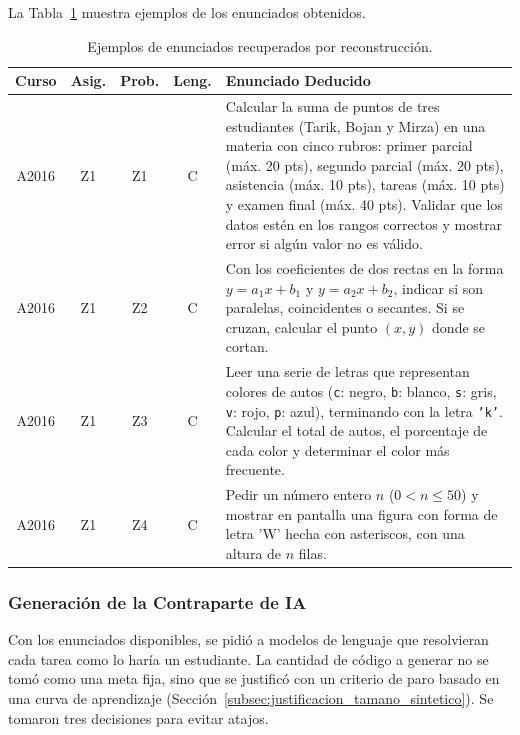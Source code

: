 La Tabla~\ref{tab:ejemplos_enunciados_inferidos} muestra ejemplos de los enunciados obtenidos.

\begin{table}[H]
    \centering
    \caption{Ejemplos de enunciados recuperados por reconstrucción.}
    \label{tab:ejemplos_enunciados_inferidos}
    \renewcommand{\arraystretch}{1.3}
    \small
    \begin{tabularx}{\textwidth}{|c|c|c|c|X|}
        \hline
        \textbf{Curso} & \textbf{Asig.} & \textbf{Prob.} & \textbf{Leng.} & \textbf{Enunciado Deducido} \\ \hline
        A2016 & Z1 & Z1 & C & Calcular la suma de puntos de tres estudiantes (Tarik, Bojan y Mirza) en una materia con cinco rubros: primer parcial (máx. 20 pts), segundo parcial (máx. 20 pts), asistencia (máx. 10 pts), tareas (máx. 10 pts) y examen final (máx. 40 pts). Validar que los datos estén en los rangos correctos y mostrar error si algún valor no es válido. \\ \hline
        A2016 & Z1 & Z2 & C & Con los coeficientes de dos rectas en la forma $y = a_1x + b_1$ y $y = a_2x + b_2$, indicar si son paralelas, coincidentes o secantes. Si se cruzan, calcular el punto $(x, y)$ donde se cortan. \\ \hline
        A2016 & Z1 & Z3 & C & Leer una serie de letras que representan colores de autos (\texttt{c}: negro, \texttt{b}: blanco, \texttt{s}: gris, \texttt{v}: rojo, \texttt{p}: azul), terminando con la letra \texttt{'k'}. Calcular el total de autos, el porcentaje de cada color y determinar el color más frecuente. \\ \hline
        A2016 & Z1 & Z4 & C & Pedir un número entero $n$ ($0 < n \le 50$) y mostrar en pantalla una figura con forma de letra 'W' hecha con asteriscos, con una altura de $n$ filas. \\ \hline
    \end{tabularx}
\end{table}

\subsubsection{Generación de la Contraparte de IA}
\label{subsec:generacion_ia}

Con los enunciados disponibles, se pidió a modelos de lenguaje que resolvieran cada tarea como lo haría un estudiante. La cantidad de código a generar no se tomó como una meta fija, sino que se justificó con un criterio de paro basado en una curva de aprendizaje (Sección~\ref{subsec:justificacion_tamano_sintetico}). Se tomaron tres decisiones para evitar atajos.

